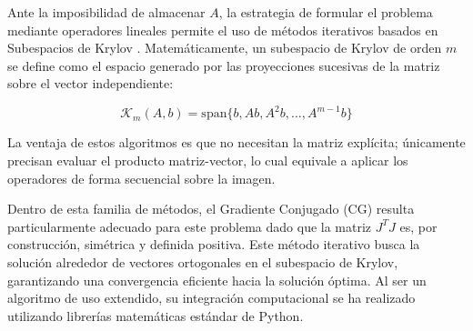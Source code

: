 Ante la imposibilidad de almacenar $A$, la estrategia de formular el problema mediante operadores lineales permite el uso de métodos iterativos basados en Subespacios de Krylov \cite{Saad2003}.
Matemáticamente, un subespacio de Krylov de orden $m$ se define como el espacio generado por las proyecciones sucesivas de la matriz sobre el vector independiente:

\begin{equation}
    \mathcal{K}_m(A, b) = \mathrm{span}\{b, Ab, A^2b, \dots, A^{m-1}b\}
\end{equation}

La ventaja de estos algoritmos es que no necesitan la matriz explícita; únicamente precisan evaluar el producto matriz-vector, lo cual equivale a aplicar los operadores de forma secuencial sobre la imagen. 

Dentro de esta familia de métodos, el Gradiente Conjugado (CG) \cite{hestenes1952methods} resulta particularmente adecuado para este problema dado que la matriz $J^T J$ es, por construcción, simétrica y definida positiva. Este método iterativo busca la solución alrededor de vectores ortogonales en el subespacio de Krylov, garantizando una convergencia eficiente hacia la solución óptima.
Al ser un algoritmo de uso extendido, su integración computacional se ha realizado utilizando librerías matemáticas estándar de Python.